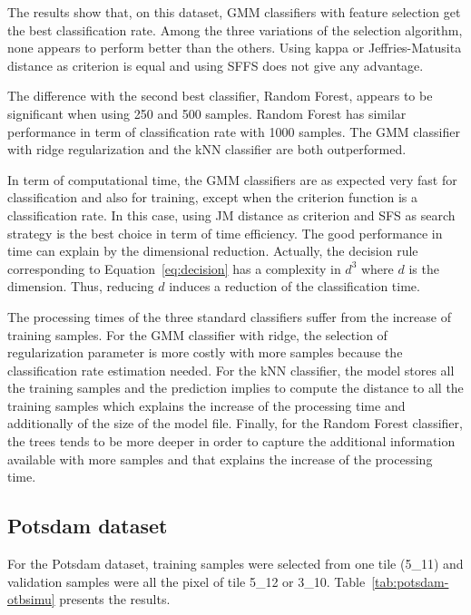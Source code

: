 \documentclass[journal,peerreview,onecolumn]{IEEEtran}
\begin{document}
    The results show that, on this  dataset, GMM classifiers with feature selection get the best classification rate. Among the three variations of the selection algorithm, none appears to perform better than the others. Using kappa or Jeffries-Matusita distance as criterion is equal and using SFFS does not give any advantage.

    The difference with the second best classifier, Random Forest, appears to be significant when using 250 and 500 samples. Random Forest has similar performance in term of classification rate with 1000 samples. The GMM classifier with ridge regularization and the kNN classifier are both outperformed.

    In term of computational time, the GMM classifiers are as expected very fast for classification and also for training, except when the criterion function is a classification rate. In this case, using JM distance as criterion and SFS as search strategy is the best choice in term of time efficiency. The good performance in time can explain by the dimensional reduction. Actually, the decision rule corresponding to Equation~\ref{eq:decision} has a complexity in $d^3$ where $d$ is the dimension. Thus, reducing $d$ induces a reduction of the classification time.

    The processing times of the three standard classifiers suffer from the increase of training samples. For the GMM classifier with ridge, the selection of regularization parameter is more costly with more samples because the classification rate estimation needed. For the kNN classifier, the model stores all the training samples and the prediction implies to compute the distance to all the training samples which explains the increase of the processing time and additionally of the size of the model file. Finally, for the Random Forest classifier, the trees tends to be more deeper in order to capture the additional information available with more samples and that explains the increase of the processing time.

    \subsection{Potsdam dataset}

    For the Potsdam  dataset, training samples were  selected from one
    tile (5\_11)  and validation  samples were all  the pixel  of tile
    5\_12  or  3\_10.  Table~\ref{tab:potsdam-otbsimu}  presents  the
    results.
\end{document}

